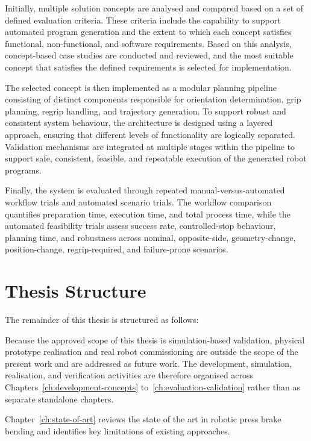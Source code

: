 Initially, multiple solution concepts are analysed and compared based on a set of defined evaluation criteria. These criteria include the capability to support automated program generation and the extent to which each concept satisfies functional, non-functional, and software requirements. Based on this analysis, concept-based case studies are conducted and reviewed, and the most suitable concept that satisfies the defined requirements is selected for implementation.

The selected concept is then implemented as a modular planning pipeline consisting of distinct components responsible for orientation determination, grip planning, regrip handling, and trajectory generation. To support robust and consistent system behaviour, the architecture is designed using a layered approach, ensuring that different levels of functionality are logically separated. Validation mechanisms are integrated at multiple stages within the pipeline to support safe, consistent, feasible, and repeatable execution of the generated robot programs.

Finally, the system is evaluated through repeated manual-versus-automated workflow trials and automated scenario trials. The workflow comparison quantifies preparation time, execution time, and total process time, while the automated feasibility trials assess success rate, controlled-stop behaviour, planning time, and robustness across nominal, opposite-side, geometry-change, position-change, regrip-required, and failure-prone scenarios.


\section{Thesis Structure}
\label{sec:introduction-thesis-structure}

The remainder of this thesis is structured as follows:

Because the approved scope of this thesis is simulation-based validation,
physical prototype realisation and real robot commissioning are outside the
scope of the present work and are addressed as future work. The development,
simulation, realisation, and verification activities are therefore organised
across Chapters~\ref{ch:development-concepts} to~\ref{ch:evaluation-validation}
rather than as separate standalone chapters.

Chapter~\ref{ch:state-of-art} reviews the state of the art in robotic press brake bending and identifies key limitations of existing approaches.

